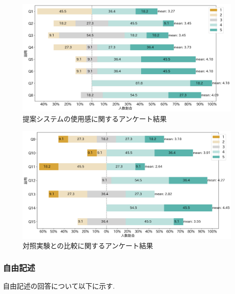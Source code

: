 \begin{figure}[h]
	\begin{center}
		\includegraphics[scale=0.35]{./imgs/answer/questAns1.png}
		\caption{提案システムの使用感に関するアンケート結果\label{fig:questAns1}}
	\end{center}
\end{figure}

\begin{figure}[h]
	\begin{center}
		\includegraphics[scale=0.35]{./imgs/answer/questAns2.png}
		\caption{対照実験との比較に関するアンケート結果\label{fig:questAns2}}
	\end{center}
\end{figure}

\clearpage
\subsubsection{自由記述}
自由記述の回答について以下に示す.



